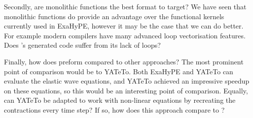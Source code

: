 Secondly, are monolithic functions the best format to target?
We have seen that monolithic functions do provide an advantage over the functional kernels currently used in ExaHyPE, however it may be the case that we can do better.
For example modern compilers have many advanced loop vectorisation features.
Does \phlat{}'s generated code suffer from its lack of loops?


Finally, how does \phlat preform compared to other approaches?
The most prominent point of comparison would be to YATeTo.
Both ExaHyPE and YATeTo can evaluate the elastic wave equations, and YATeTo achieved an impressive speedup on these equations, so this would be an interesting point of comparison.
Equally, can YATeTo be adapted to work with non-linear equations by recreating the contractions every time step?
If so, how does this approach compare to \phlat?

